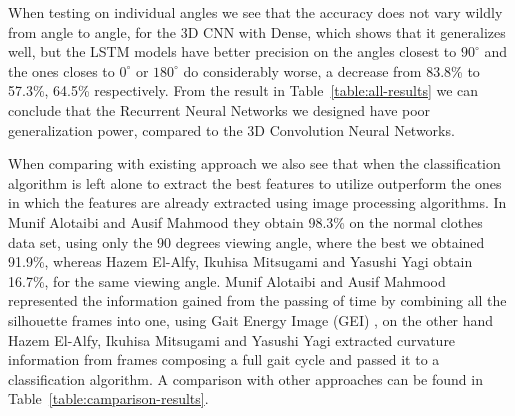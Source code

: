 \documentclass[12pt]{article}
\theoremstyle{definition}
\begin{document}
	When testing on individual angles we see that the accuracy does not vary wildly from angle to angle, for the 3D CNN with Dense, which shows that it generalizes well, but the LSTM models have better precision on the angles closest to $90^\circ$ and the ones closes to $0^\circ$ or $180^\circ$ do considerably worse, a decrease from 83.8\% to 57.3\%, 64.5\% respectively. From the result in Table~\ref{table:all-results} we can conclude that the Recurrent Neural Networks we designed have poor generalization power, compared to the 3D Convolution Neural Networks.

	When comparing with existing approach we also see that when the classification algorithm is left alone to extract the best features to utilize outperform the ones in which the features are already extracted using image processing algorithms. In Munif Alotaibi and Ausif Mahmood \cite{gait-with-gei} they obtain 98.3\% on the normal clothes data set, using only the 90 degrees viewing angle, where the best we obtained 91.9\%, whereas Hazem El-Alfy, Ikuhisa Mitsugami and Yasushi Yagi \cite{gait-with-curvature-map} obtain 16.7\%, for the same viewing angle. Munif Alotaibi and Ausif Mahmood represented the information gained from the passing of time by combining all the silhouette frames into one, using Gait Energy Image (GEI) \cite{gei}, on the other hand Hazem El-Alfy, Ikuhisa Mitsugami and Yasushi Yagi extracted curvature information from frames composing a full gait cycle and passed it to a classification algorithm. A comparison with other approaches can be found in Table~\ref{table:camparison-results}.
\end{document}
